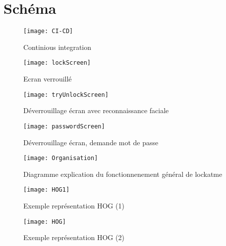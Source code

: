 \appendix
\chapter{Schéma}
\begin{figure}[h]
  \begin{center}
  \texttt{[image: CI-CD]}
  \caption{Continious integration}
  \label{fig:CI-CD}
  \end{center}
\end{figure}

\newpage

\begin{figure}[h]
  \begin{center}
  \texttt{[image: lockScreen]}
  \caption{Ecran verrouillé}
  \label{fig:lockScreen}
\end{center}
\end{figure}

\begin{figure}[h]
  \begin{center}
  \texttt{[image: tryUnlockScreen]}
  \caption{Déverrouillage écran avec reconnaissance faciale}
  \label{fig:tryUnlockScreen}
\end{center}
\end{figure}

\begin{figure}[h]
  \begin{center}
  \texttt{[image: passwordScreen]}
  \caption{Déverrouillage écran, demande mot de passe}
  \label{fig:passwordScreen}
\end{center}
\end{figure}

\begin{figure}[h]
  \begin{center}
  \texttt{[image: Organisation]}
  \caption{Diagramme explication du fonctionnenement général de lockatme}
\end{center}
\end{figure}

\begin{figure}[h]
  \begin{center}
  \texttt{[image: HOG1]}
  \caption{Exemple représentation HOG (1)}
  \label{fig:HOG}
\end{center}
\end{figure}

\begin{figure}[h]
  \begin{center}
  \texttt{[image: HOG]}
  \caption{Exemple représentation HOG (2)}
  \label{fig:HOG1}
\end{center}
\end{figure}

